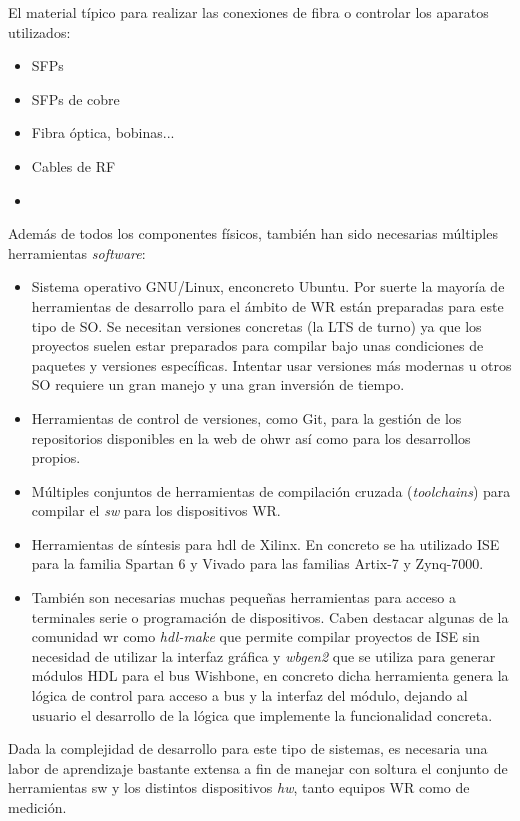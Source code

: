 El material típico para realizar las conexiones de fibra o controlar los 
aparatos utilizados:

\begin{itemize}
	\item SFPs 
	\item SFPs de cobre
	\item Fibra óptica, bobinas...
	\item Cables de RF 
	\item {}
\end{itemize}

Además de todos los componentes físicos, también han sido necesarias múltiples 
herramientas \textit{software}:

\begin{itemize}
	\item Sistema operativo GNU/Linux, enconcreto Ubuntu. Por suerte la mayoría 
	de herramientas de desarrollo para el ámbito de WR están preparadas para 
	este tipo de SO. Se necesitan versiones concretas (la LTS de turno) ya que 
	los proyectos suelen estar preparados para compilar bajo unas condiciones 
	de paquetes y versiones específicas. Intentar usar versiones más modernas u 
	otros SO requiere un gran manejo y una gran inversión de tiempo.
	
	\item Herramientas de control de versiones, como Git, para la gestión de 
	los repositorios disponibles en la web de \gls{ohwr} \cite{website:ohwr} 
	así como para los desarrollos propios.
	
	\item Múltiples conjuntos de herramientas de compilación cruzada 
	(\textit{toolchains}) para compilar el \textit{sw} para los dispositivos WR.
	
	\item Herramientas de síntesis para \gls{hdl} de Xilinx. En concreto se ha 
	utilizado ISE para la familia Spartan 6 y Vivado para las familias Artix-7 
	y Zynq-7000.
	
	\item También son necesarias muchas pequeñas herramientas para acceso a 
	terminales serie o programación de dispositivos. Caben destacar algunas de 
	la comunidad \gls{wr} como \textit{hdl-make} que permite compilar proyectos 
	de ISE sin necesidad de utilizar la interfaz gráfica y \textit{wbgen2} que 
	se utiliza para generar módulos HDL para el bus Wishbone, en concreto dicha 
	herramienta genera 
	la lógica de control para acceso a bus y la interfaz del módulo, dejando al 
	usuario el desarrollo de la lógica que implemente la funcionalidad concreta.
\end{itemize}

Dada la complejidad de desarrollo para este tipo de sistemas, es necesaria una 
labor de aprendizaje bastante extensa a fin de manejar con soltura el conjunto 
de herramientas sw y los distintos dispositivos \textit{hw}, tanto equipos WR 
como de medición.